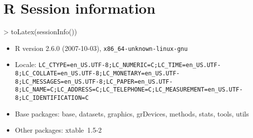 \documentclass[letterpaper]{article}
\begin{document}
\section{R Session information}
\begin{Schunk}
\begin{Sinput}
> toLatex(sessionInfo())
\end{Sinput}
\begin{itemize}
  \item R version 2.6.0 (2007-10-03), \verb|x86_64-unknown-linux-gnu|
  \item Locale: \verb|LC_CTYPE=en_US.UTF-8;LC_NUMERIC=C;LC_TIME=en_US.UTF-8;LC_COLLATE=en_US.UTF-8;LC_MONETARY=en_US.UTF-8;LC_MESSAGES=en_US.UTF-8;LC_PAPER=en_US.UTF-8;LC_NAME=C;LC_ADDRESS=C;LC_TELEPHONE=C;LC_MEASUREMENT=en_US.UTF-8;LC_IDENTIFICATION=C|
  \item Base packages: base, datasets, graphics, grDevices, methods,
    stats, tools, utils
  \item Other packages: xtable~1.5-2
\end{itemize}\end{Schunk}
\end{document}
